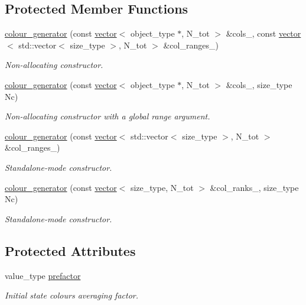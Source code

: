 \subsection*{Protected Member Functions}
\begin{DoxyCompactItemize}
\item 
\hyperlink{a00083_abcc832bac1c602913af2ff13035eea6f}{colour\-\_\-generator} (const \hyperlink{a00559}{vector}$<$ object\-\_\-type $\ast$, N\-\_\-tot $>$ \&cols\-\_\-, const \hyperlink{a00559}{vector}$<$ std\-::vector$<$ size\-\_\-type $>$, N\-\_\-tot $>$ \&col\-\_\-ranges\-\_\-)
\begin{DoxyCompactList}\small\item\em Non-\/allocating constructor. \end{DoxyCompactList}\item 
\hypertarget{a00083_a3d3a17d89e455874add368c000cdf009}{\hyperlink{a00083_a3d3a17d89e455874add368c000cdf009}{colour\-\_\-generator} (const \hyperlink{a00559}{vector}$<$ object\-\_\-type $\ast$, N\-\_\-tot $>$ \&cols\-\_\-, size\-\_\-type Nc)}\label{a00083_a3d3a17d89e455874add368c000cdf009}

\begin{DoxyCompactList}\small\item\em Non-\/allocating constructor with a global range argument. \end{DoxyCompactList}\item 
\hyperlink{a00083_af24b9e1568c3cfcdee5bcc68cb3887f6}{colour\-\_\-generator} (const \hyperlink{a00559}{vector}$<$ std\-::vector$<$ size\-\_\-type $>$, N\-\_\-tot $>$ \&col\-\_\-ranges\-\_\-)
\begin{DoxyCompactList}\small\item\em Standalone-\/mode constructor. \end{DoxyCompactList}\item 
\hyperlink{a00083_a473e0ae72e1caebca747cbc4d63544b0}{colour\-\_\-generator} (const \hyperlink{a00559}{vector}$<$ size\-\_\-type, N\-\_\-tot $>$ \&col\-\_\-ranks\-\_\-, size\-\_\-type Nc)
\begin{DoxyCompactList}\small\item\em Standalone-\/mode constructor. \end{DoxyCompactList}\end{DoxyCompactItemize}
\subsection*{Protected Attributes}
\begin{DoxyCompactItemize}
\item 
\hypertarget{a00083_aa86ff60881da662e7dc5b26c33b735ff}{value\-\_\-type \hyperlink{a00083_aa86ff60881da662e7dc5b26c33b735ff}{prefactor}}\label{a00083_aa86ff60881da662e7dc5b26c33b735ff}

\begin{DoxyCompactList}\small\item\em Initial state colours averaging factor. \end{DoxyCompactList}\end{DoxyCompactItemize}


